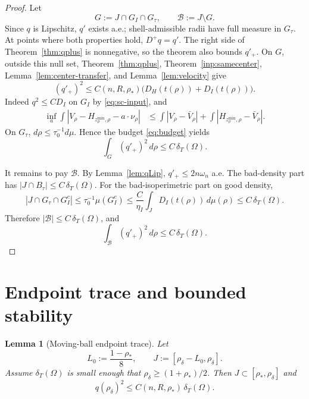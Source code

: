 \documentclass[11pt]{amsart}
\newtheorem{lemma}[theorem]{Lemma}
\theoremstyle{definition}
\newcommand{\Om}{\Omega}
\newcommand{\dT}{\delta_T}
\newcommand{\rstar}{\rho_*}
\newcommand{\rdel}{\rho_\delta}
\begin{document}
\begin{proof}
Let
\[
   G:=J\cap G_I\cap G_\tau,\qquad \mathcal B:=J\setminus G .
\]
Since \(q\) is Lipschitz, \(q'\) exists a.e.; shell-admissible radii have
full measure in \(G_\tau\).  At points where both properties hold,
\(D^+q=q'\).  The right side of Theorem~\ref{thm:qplus} is nonnegative,
so the theorem also bounds \(q'_+\).  On \(G\), outside this null set,
Theorem~\ref{thm:qplus}, Theorem~\ref{inp:samecenter},
Lemma~\ref{lem:center-transfer}, and Lemma~\ref{lem:velocity} give
\[
   (q'_+)^2
   \le C(n,R,\rstar)\bigl(D_H(t(\rho))+D_I(t(\rho))\bigr).
\]
Indeed \(q^2\le C D_I\) on \(G_I\) by \eqref{eq:sc-input}, and
\[
\begin{aligned}
   \inf_a\int |V_\rho-H_{z_\rho^{\min},\rho}-a\cdot\nu_\rho|
   &\le
   \int |V_\rho-\bar V_\rho|
   +\int |H_{z_\rho^{\min},\rho}-\bar V_\rho|.
\end{aligned}
\]
On \(G_\tau\), \(d\rho\le\tau_0^{-1}d\mu\).  Hence the budget
\eqref{eq:budget} yields
\[
   \int_G(q'_+)^2\,d\rho\le C\,\dT(\Om).
\]

It remains to pay \(\mathcal B\).  By Lemma~\ref{lem:qLip},
\(q'_+\le2n\omega_n\) a.e.  The bad-density part has
\(|J\cap B_\tau|\le C\,\dT(\Om)\).  For the bad-isoperimetric part on
good density,
\[
   |J\cap G_\tau\cap G_I^c|
   \le \tau_0^{-1}\mu(G_I^c)
   \le \frac{C}{\eta_I}\int_JD_I(t(\rho))\,d\mu(\rho)
   \le C\,\dT(\Om).
\]
Therefore \(|\mathcal B|\le C\,\dT(\Om)\), and
\[
   \int_{\mathcal B}(q'_+)^2\,d\rho\le C\,\dT(\Om).
\]
\end{proof}

\section{Endpoint trace and bounded stability}\label{sec:endpoint}

\begin{lemma}[Moving-ball endpoint trace]
\label{lem:endpoint}
Let
\[
   L_0:=\frac{1-\rstar}{8},\qquad
   J:=[\rdel-L_0,\rdel].
\]
Assume \(\dT(\Om)\) is small enough that
\(\rdel\ge(1+\rstar)/2\).  Then \(J\subset[\rstar,\rdel]\) and
\[
   q(\rdel)^2\le C(n,R,\rstar)\,\dT(\Om).
\]
\end{lemma}
\end{document}
